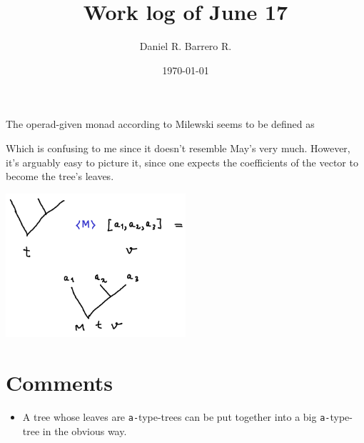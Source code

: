 \documentclass{amsart}
\title{Work log of June 17}
\author{Daniel R. Barrero R.}
\date{\today}
\begin{document}
\maketitle

\section{}

The operad-given monad according to Milewski seems to be defined as



Which is confusing to me since it doesn't resemble May's very much. However, it's
arguably easy to picture it, since one expects the coefficients of the vector to become
the tree's leaves.

\bigskip
\bigskip

\includegraphics[width=0.5\textwidth]{tree_w_vecComp}

\section{Comments}

\begin{itemize}
	\item A tree whose leaves are \texttt{a-}type-trees can be put together into a
		big \texttt{a-}type-tree in the obvious way.
\end{itemize}
\end{document}
